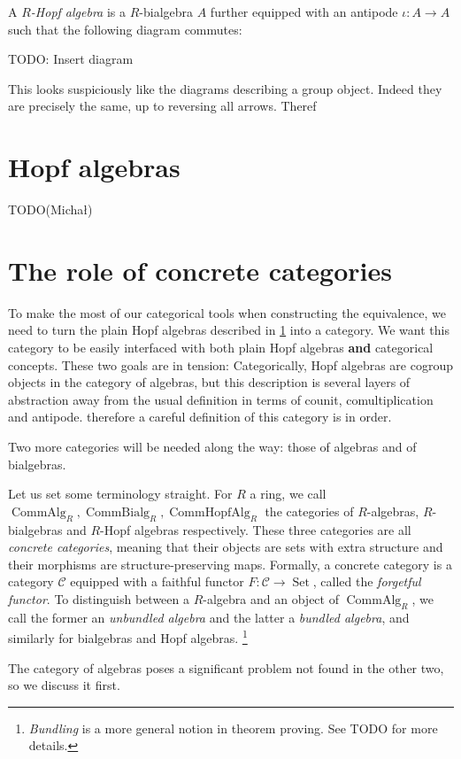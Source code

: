 \documentclass{article}
\newcommand{\mcC}{\mathcal C}
\DeclareMathOperator{\Set}{Set}
\DeclareMathOperator{\CommAlg}{CommAlg}
\DeclareMathOperator{\CommBialg}{CommBialg}
\DeclareMathOperator{\CommHopfAlg}{CommHopfAlg}
\begin{document}
A \emph{$R$-Hopf algebra} is a $R$-bialgebra $A$ further equipped with an antipode $\iota : A \to A$
such that the following diagram commutes:

TODO: Insert diagram

This looks suspiciously like the diagrams describing a group object.
Indeed they are precisely the same, up to reversing all arrows.
Theref


\section{Hopf algebras}\label{sec:hopf}


TODO(Michał)


\section{The role of concrete categories}\label{sec:concrete-categories}


To make the most of our categorical tools when constructing the equivalence, we need to turn the plain Hopf algebras described in \cref{sec:hopf} into a category.
We want this category to be easily interfaced with both plain Hopf algebras {\bf and} categorical concepts.
These two goals are in tension:
Categorically, Hopf algebras are cogroup objects in the category of algebras, but this description is several layers of abstraction away from the usual definition in terms of counit, comultiplication and antipode. therefore a careful definition of this category is in order.

Two more categories will be needed along the way: those of algebras and of bialgebras.

Let us set some terminology straight.
For $R$ a ring, we call $\CommAlg_R, \CommBialg_R, \CommHopfAlg_R$ the categories of $R$-algebras, $R$-bialgebras and $R$-Hopf algebras respectively.
These three categories are all \emph{concrete categories}, meaning that their objects are sets with extra structure and their morphisms are structure-preserving maps.
Formally, a concrete category is a category $\mcC$ equipped with a faithful functor $F : \mcC \to \Set$, called the \emph{forgetful functor}.
To distinguish between a $R$-algebra and an object of $\CommAlg_R$, we call the former an \emph{unbundled algebra} and the latter a \emph{bundled algebra}, and similarly for bialgebras and Hopf algebras.
\footnote{\emph{Bundling} is a more general notion in theorem proving. See TODO for more details.}

The category of algebras poses a significant problem not found in the other two, so we discuss it first.
\end{document}
